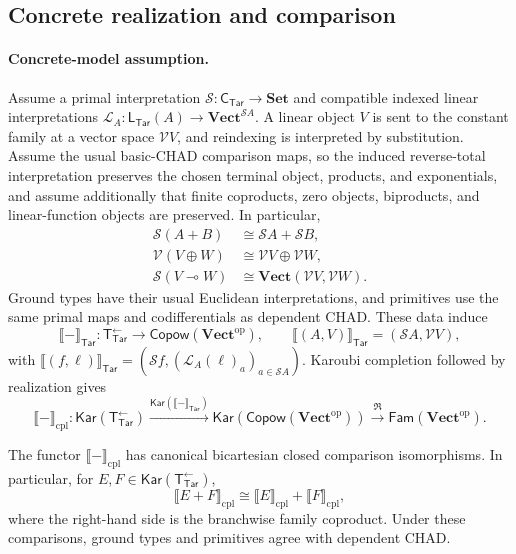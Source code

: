 \documentclass[runningheads,envcountsame]{llncs}
\newcommand{\Set}{\mathbf{Set}}
\newcommand{\Vect}{\mathbf{Vect}}
\newcommand{\Vectop}{\mathbf{Vect}^{\mathrm{op}}}
\newcommand{\Tar}{\mathsf{Tar}}
\newcommand{\CTar}{\mathsf C_{\Tar}}
\newcommand{\LTar}{\mathsf L_{\Tar}}
\newcommand{\TotTar}{\mathsf T_{\Tar}^{\leftarrow}}
\newcommand{\Copow}{\mathsf{Copow}}
\newcommand{\Fam}{\mathsf{Fam}}
\newcommand{\Kar}{\mathsf{Kar}}
\newcommand{\Rlz}{\mathfrak R}
\begin{document}
\subsection{Concrete realization and comparison}

\paragraph{Concrete-model assumption.}
Assume a primal interpretation $\mathcal S:\CTar\to\Set$ and compatible
indexed linear interpretations
$\mathcal L_A:\LTar(A)\to\Vect^{\mathcal S A}$. A linear object $V$ is sent
to the constant family at a vector space $\mathcal V V$, and reindexing is
interpreted by substitution. Assume the usual basic-CHAD comparison maps, so
the induced reverse-total interpretation preserves the chosen terminal object,
products, and exponentials, and assume additionally that finite coproducts,
zero objects, biproducts, and linear-function objects are preserved. In
particular,
$$
\begin{aligned}
\mathcal S(A+B)&\cong\mathcal S A+\mathcal S B,\\
\mathcal V(V\oplus W)&\cong\mathcal V V\oplus\mathcal V W,\\
\mathcal S(V\multimap W)&\cong\Vect(\mathcal V V,\mathcal V W).
\end{aligned}
$$
Ground types have their usual Euclidean interpretations, and primitives use the
same primal maps and codifferentials as dependent CHAD. These data induce
$$
\llbracket-\rrbracket_\Tar:\TotTar\longrightarrow\Copow(\Vectop),
\qquad
\llbracket(A,V)\rrbracket_\Tar=(\mathcal S A,\mathcal V V),
$$
with
$\llbracket(f,\ell)\rrbracket_\Tar=
(\mathcal S f,(\mathcal L_A(\ell)_a)_{a\in\mathcal S A})$.
Karoubi completion followed by realization gives
$$
\llbracket-\rrbracket_{\mathrm{cpl}}:
\Kar(\TotTar)
\xrightarrow{\Kar(\llbracket-\rrbracket_\Tar)}
\Kar(\Copow(\Vectop))
\xrightarrow{\Rlz}
\Fam(\Vectop).
$$

\begin{proposition}
\label{prop:standard-target-compatibility}
The functor $\llbracket-\rrbracket_{\mathrm{cpl}}$ has canonical bicartesian
closed comparison isomorphisms. In particular, for $E,F\in\Kar(\TotTar)$,
$$
\llbracket E+F\rrbracket_{\mathrm{cpl}}
\cong
\llbracket E\rrbracket_{\mathrm{cpl}}
+
\llbracket F\rrbracket_{\mathrm{cpl}},
$$
where the right-hand side is the branchwise family coproduct. Under these
comparisons, ground types and primitives agree with dependent CHAD.
\end{proposition}
\end{document}

